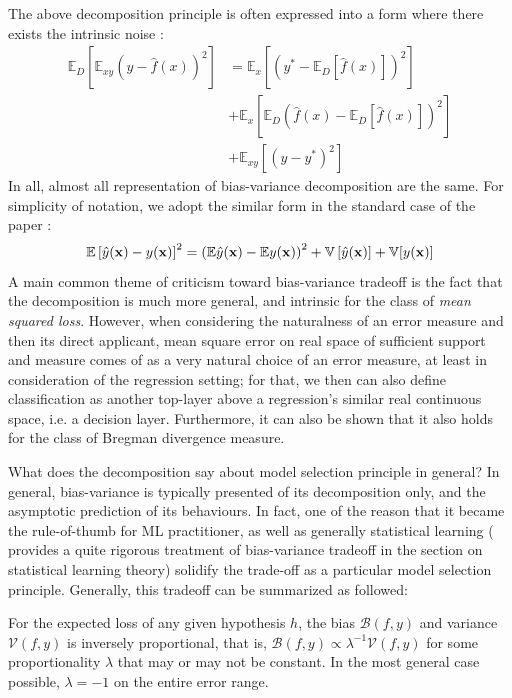 \documentclass[
  journal=largetwo,
  year=2025,
  volume=37,
]{cup-journal}
\begin{document}
The above decomposition principle is often expressed into a form where there exists the intrinsic noise \cite{brown2024biasvariance}: 
\begin{equation}
    \begin{split}
        \mathbb{E}_D \left[ \mathbb{E}_{xy} \left( y - \hat{f}(x) \right)^2 \right]
        &= 
         \mathbb{E}_x \left[ \left( y^* - \mathbb{E}_D[\hat{f}(x)] \right)^2 \right]\\
        &+ \mathbb{E}_x \left[ \mathbb{E}_D \left( \hat{f}(x) - \mathbb{E}_D[\hat{f}(x)] \right)^2 \right] \\
        &+ \mathbb{E}_{xy} \left[ \left( y - y^* \right)^2 \right]
    \end{split}
    \end{equation}
In all, almost all representation of bias-variance decomposition are the same. For simplicity of notation, we adopt the similar form in the standard case of the paper \cite{adlam2020understandingdoubledescentrequires}: 
\begin{equation}
    \mathbb{E} \left[{\hat{y}(\mathbf{x})-y(\mathbf{x})}\right]^2 = \left({\mathbb{E}\hat{y}(\mathbf{x}) - \mathbb{E} y(\mathbf{x})}\right)^2 + \mathbb{V}\left[{\hat{y}(\mathbf{x})}\right] + \mathbb{V}[{y(\mathbf{x})}]
\end{equation}
A main common theme of criticism toward bias-variance tradeoff is the fact that the decomposition is much more general, and intrinsic for the class of \textit{mean squared loss}. However, when considering the naturalness of an error measure and then its direct applicant, mean square error on real space of sufficient support and measure comes of as a very natural choice of an error measure, at least in consideration of the regression setting; for that, we then can also define classification as another top-layer above a regression's similar real continuous space, i.e. a decision layer. Furthermore, it can also be shown \cite{brown2024biasvariance,PfauBregmanDivergence} that it also holds for the class of Bregman divergence measure. 

What does the decomposition say about model selection principle in general? In general, bias-variance is typically presented of its decomposition only, and the asymptotic prediction of its behaviours. In fact, one of the reason that it became the rule-of-thumb for ML practitioner, as well as generally statistical learning (\cite{lafon_understanding_2024} provides a quite rigorous treatment of bias-variance tradeoff in the section on statistical learning theory) solidify the trade-off as a particular model selection principle. Generally, this tradeoff can be summarized as followed: 
\begin{theorem}\label{thm:bias-variance}
    For the expected loss of any given hypothesis $h$, the bias $\mathcal{B}(f,y)$ and variance $\mathcal{V}(f,y)$ is inversely proportional, that is, $\mathcal{B}(f,y)\propto \lambda^{-1} \mathcal{V}(f,y)$ for some proportionality $\lambda$ that may or may not be constant. In the most general case possible, $\lambda = -1$ on the entire error range. 
\end{theorem}
\end{document}
